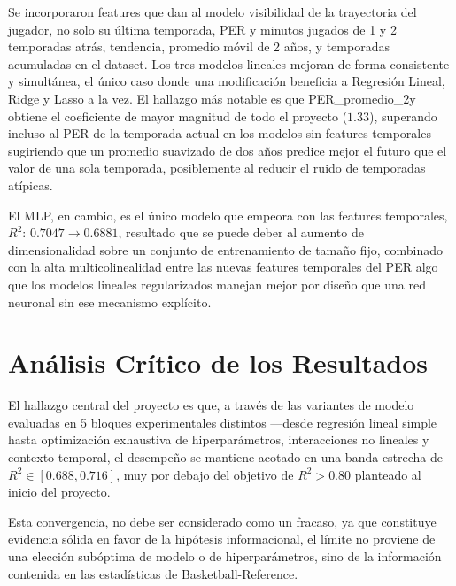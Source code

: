 \documentclass[11pt,a4paper]{article}
\begin{document}
Se incorporaron features que dan al modelo visibilidad de la trayectoria
del jugador, no solo su última temporada, PER y minutos jugados de 1 y 2
temporadas atrás, tendencia, promedio móvil de 2 años, y temporadas
acumuladas en el dataset. Los tres modelos lineales mejoran de forma
consistente y simultánea,
el único caso donde una modificación beneficia
a Regresión Lineal, Ridge y Lasso a la vez. El hallazgo más
notable es que PER\_promedio\_2y obtiene el coeficiente de mayor
magnitud de todo el proyecto ($1.33$), superando incluso al PER
de la temporada actual en los modelos sin features temporales —sugiriendo
que un promedio suavizado de dos años predice mejor el futuro que el valor
de una sola temporada, posiblemente al reducir el ruido de temporadas
atípicas.

El MLP, en cambio, es el único modelo que empeora con las
features temporales, $R^2$: $0.7047 \to 0.6881$, resultado que se puede deber al
aumento de dimensionalidad sobre un conjunto de
entrenamiento de tamaño fijo, combinado con la alta multicolinealidad
entre las nuevas features temporales del PER algo que los modelos lineales
regularizados manejan mejor por diseño que una red neuronal sin ese
mecanismo explícito.

\section{Análisis Crítico de los Resultados}

El hallazgo central del proyecto es que, a través de las variantes
de modelo evaluadas en 5 bloques experimentales distintos —desde
regresión lineal simple hasta optimización exhaustiva de hiperparámetros,
interacciones no lineales y contexto temporal, el desempeño se mantiene
acotado en una banda estrecha de $R^2 \in [0.688, 0.716]$, muy por debajo
del objetivo de $R^2 > 0.80$ planteado al inicio del proyecto.

Esta convergencia, no debe ser considerado como un fracaso, ya que constituye
evidencia sólida en favor de la hipótesis
informacional, el límite no proviene de una elección subóptima de modelo
o de hiperparámetros, sino de la información contenida en las estadísticas
de Basketball-Reference.
\end{document}
